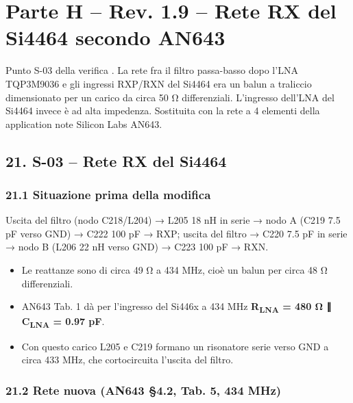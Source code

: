 \clearpage
\section[Parte H – Rev. 1.9 – Rete RX del Si4464 secondo AN643]{Parte H – Rev. 1.9 – Rete RX del Si4464 secondo AN643}

Punto S-03 della verifica . La rete fra il filtro passa-basso dopo l'LNA TQP3M9036 e gli ingressi RXP/\allowbreak{}RXN del Si4464 era un balun a traliccio dimensionato per un carico da circa 50 Ω differenziali. L'ingresso dell'LNA del Si4464 invece è ad alta impedenza. Sostituita con la rete a 4 elementi della application note Silicon Labs AN643.

\subsection[21. S-03 – Rete RX del Si4464]{21. S-03 – Rete RX del Si4464  }

\subsubsection[21.1 Situazione prima della modifica]{21.1 Situazione prima della modifica}

Uscita del filtro (nodo C218/\allowbreak{}L204) → L205 18 nH in serie → nodo A (C219 7.5 pF verso GND) → C222 100 pF → RXP; uscita del filtro → C220 7.5 pF in serie → nodo B (L206 22 nH verso GND) → C223 100 pF → RXN.

\begin{itemize}
\item Le reattanze sono di circa 49 Ω a 434 MHz, cioè un balun per circa 48 Ω differenziali.
\item AN643 Tab. 1 dà per l'ingresso del Si446x a 434 MHz \textbf{R\textsubscript{LNA} = 480 Ω ∥ C\textsubscript{LNA} = 0.97 pF}.
\item Con questo carico L205 e C219 formano un risonatore serie verso GND a circa 433 MHz, che cortocircuita l'uscita del filtro.
\end{itemize}

\subsubsection[21.2 Rete nuova (AN643 §4.2, Tab. 5, 434 MHz)]{21.2 Rete nuova (AN643 §4.2, Tab. 5, 434 MHz)}


